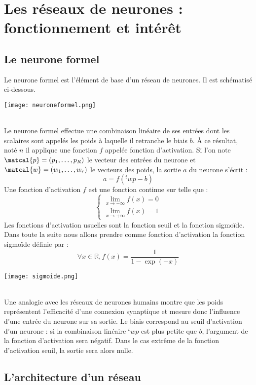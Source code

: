 \documentclass[a4paper, 11pt]{article}
\begin{document}
\section{Les réseaux de neurones : fonctionnement et intérêt}
\subsection{Le neurone formel}

Le neurone formel est l'élément de base d'un réseau de neurones. Il est schématisé ci-dessous. \\
\begin{center}
\texttt{[image: neuroneformel.png]} 
\end{center}

\\
Le neurone formel effectue une combinaison linéaire de ses entrées dont les scalaires sont appelés les poids à laquelle il retranche le biais $b$. À ce résultat, noté $n$ il applique une fonction $f$ appelée fonction d'activation. Si l'on note $\matcal{p}=(p_1, \dots,p_R)$ le vecteur des entrées du neurone et $\matcal{w}=(w_1, \dots,w_r)$ le vecteurs des poids, la sortie $a$ du neurone s'écrit :
$$a=f({}^t \! wp-b)$$ 
Une fonction d'activation $f$ est une fonction continue sur  telle que :
$$ \left\{
\begin{array}{l}
 \lim\limits_{x \to -\infty}f(x)=0 \\
 \lim\limits_{x \to +\infty}f(x)=1
\end{array}
$$
Les fonctions d'activation usuelles sont la fonction seuil et la fonction sigmoïde. Dans toute la suite nous allons prendre comme fonction d'activation la fonction sigmoïde définie par : 
$$ \forall x \in \mathbb{R}, f(x)=\frac{1}{1-\exp(-x)} $$
\begin{center}
\texttt{[image: sigmoide.png]}
\end{center}
\\
Une analogie avec les réseaux de neurones humains montre que les poids représentent l'efficacité d'une connexion synaptique et mesure donc l'influence d'une entrée du neurone sur sa sortie. Le biais correspond au seuil d'activation d'un neurone : si la combinaison linéaire ${}^t \! wp$ est plus petite que $b$, l'argument de la fonction d'activation sera négatif. Dans le cas extrême de la fonction d'activation seuil, la sortie sera alors nulle. 

\subsection{L'architecture d'un réseau}
\end{document}
